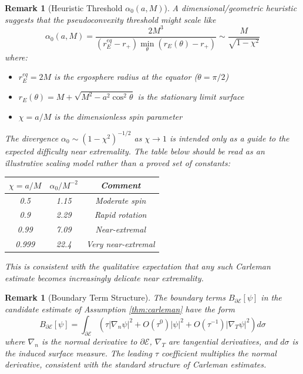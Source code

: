 \documentclass[12pt,a4paper]{article}
\newtheorem{remark}[theorem]{Remark}
\begin{document}
\begin{remark}[Heuristic Threshold $\alpha_0(a,M)$]\label{rem:alpha0-explicit}
A dimensional/geometric heuristic suggests that the pseudoconvexity threshold might scale like
\begin{equation}
\alpha_0(a, M) = \frac{2M^3}{(r_E^{eq} - r_+)\min_\theta(r_E(\theta) - r_+)} \sim \frac{M}{\sqrt{1 - \chi^2}}
\end{equation}
where:
\begin{itemize}
    \item $r_E^{eq} = 2M$ is the ergosphere radius at the equator ($\theta = \pi/2$)
    \item $r_E(\theta) = M + \sqrt{M^2 - a^2\cos^2\theta}$ is the stationary limit surface
    \item $\chi = a/M$ is the dimensionless spin parameter
\end{itemize}
The divergence $\alpha_0 \sim (1-\chi^2)^{-1/2}$ as $\chi \to 1$ is intended only as a guide to the expected difficulty near extremality. The table below should be read as an illustrative scaling model rather than a proved set of constants:
\begin{center}
\begin{tabular}{@{}ccc@{}}
\toprule
$\chi = a/M$ & $\alpha_0/M^{-2}$ & Comment \\
\midrule
0.5 & 1.15 & Moderate spin \\
0.9 & 2.29 & Rapid rotation \\
0.99 & 7.09 & Near-extremal \\
0.999 & 22.4 & Very near-extremal \\
\bottomrule
\end{tabular}
\end{center}
This is consistent with the qualitative expectation that any such Carleman estimate becomes increasingly delicate near extremality.
\end{remark}

\begin{remark}[Boundary Term Structure]\label{rem:boundary-terms}
The boundary terms $B_{\partial\mathcal{E}}[\psi]$ in the candidate estimate of Assumption \ref{thm:carleman} have the form
\begin{equation}
B_{\partial\mathcal{E}}[\psi] = \int_{\partial\mathcal{E}} \left(\tau|\nabla_n \psi|^2 + O(\tau^0)|\psi|^2 + O(\tau^{-1})|\nabla_T\psi|^2\right) d\sigma
\end{equation}
where $\nabla_n$ is the normal derivative to $\partial\mathcal{E}$, $\nabla_T$ are tangential derivatives, and $d\sigma$ is the induced surface measure. The leading $\tau$ coefficient multiplies the normal derivative, consistent with the standard structure of Carleman estimates.
\end{remark}
\end{document}
